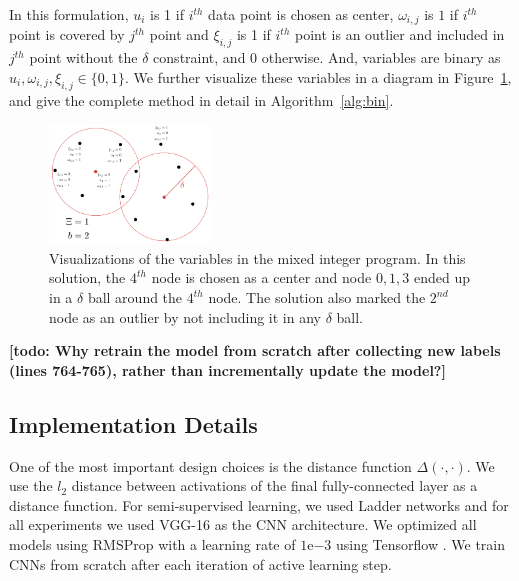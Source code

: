 \documentclass{article}
\newcommand{\todo}[1]{{\bf \color{red}[todo: #1]}}
\begin{document}
In this formulation, $u_i$ is 1 if $i^{th}$ data point is chosen as center, $\omega_{i,j}$ is $1$ if $i^{th}$ point is covered by $j^{th}$ point and $\xi_{i,j}$ is 1 if $i^{th}$ point is an outlier and included in $j^{th}$ point without the $\delta$ constraint, and $0$ otherwise. And, variables are binary as $u_i, \omega_{i,j}, \xi_{i,j} \in \{0,1\}$. We further visualize these variables in a diagram in Figure~\ref{mip}, and give the complete method in detail in Algorithm~\ref{alg:bin}. 


\begin{figure}
\vspace{-5mm}
  \begin{center}
\includegraphics[width=0.38\textwidth]{mip.pdf}
\end{center}
    \caption{Visualizations of the variables in the mixed integer program. In this solution, the $4^{th}$ node is chosen as a center and node $0,1,3$ ended up in a $\delta$ ball around the $4^{th}$ node. The solution also marked the $2^{nd}$ node as an outlier by not including it in any $\delta$ ball.}
\label{mip}
\vspace{-12mm}
\end{figure}



\todo{Why retrain the model from scratch after collecting new labels (lines 764-765), rather than incrementally update the model?}

\subsection{Implementation Details}
\label{sec:imp}
One of the most important design choices is the distance function $\Delta(\cdot,\cdot)$. We use the $l_2$ distance between activations of the final fully-connected layer as a distance function. For semi-supervised learning, we used Ladder networks \cite{ladder} and for all experiments we used VGG-16 \cite{vgg} as the CNN architecture. We optimized all models using RMSProp with a learning rate of $1\mathrm{e}{-3}$ using Tensorflow \cite{tensorflow}. We train CNNs from scratch after each iteration of active learning step.
\end{document}
